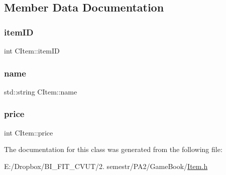 \subsection{Member Data Documentation}
\mbox{\label{class_c_item_a2a55ac7539e4dbdb30195078f5872bb2}} 
\subsubsection{\texorpdfstring{item\+ID}{itemID}}
{\footnotesize\ttfamily int C\+Item\+::item\+ID\hspace{0.3cm}{\ttfamily [protected]}}

\mbox{\label{class_c_item_a4d8b073203d9d09291e0fd07f4bcc479}} 
\subsubsection{\texorpdfstring{name}{name}}
{\footnotesize\ttfamily std\+::string C\+Item\+::name\hspace{0.3cm}{\ttfamily [protected]}}

\mbox{\label{class_c_item_ad2512107bbbb688e9141a5d5ea6d47de}} 
\subsubsection{\texorpdfstring{price}{price}}
{\footnotesize\ttfamily int C\+Item\+::price\hspace{0.3cm}{\ttfamily [protected]}}



The documentation for this class was generated from the following file\+:\begin{DoxyCompactItemize}
\item 
E\+:/\+Dropbox/\+B\+I\+\_\+\+F\+I\+T\+\_\+\+C\+V\+U\+T/2. semestr/\+P\+A2/\+Game\+Book/\mbox{\hyperlink{_item_8h}{Item.\+h}}\end{DoxyCompactItemize}
